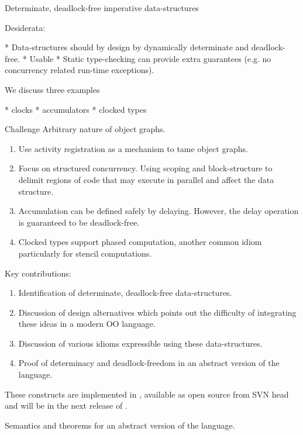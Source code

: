 Determinate, deadlock-free imperative data-structures

Desiderata:

 * Data-structures should by design by dynamically determinate and
   deadlock-free.
 * Usable
 * Static type-checking can provide extra guarantees (e.g. no
   concurrency related run-time exceptions).

We discuss three examples

  * clocks
  * accumulators
  * clocked types

Challenge
  Arbitrary nature of object graphs.


{\em 
\begin{enumerate}
\item Use activity registration as a mechanism to tame object graphs.
\item Focus on structured concurrency. Using scoping and block-structure
    to delimit regions of code that may execute in parallel and affect
    the data structure.

\item Accumulation can be defined safely by delaying. However, the delay
    operation is guaranteed to be deadlock-free.

\item Clocked types support phased computation, another common idiom
    particularly for stencil computations.
\end{enumerate}
}

Key contributions:
{\em 
\begin{enumerate}
\item Identification of determinate, deadlock-free data-structures. 
\item Discussion of design alternatives which points out the
  difficulty of integrating these ideas in a modern OO language.
\item Discussion of various idioms expressible using these data-structures.
\item Proof of determinacy and deadlock-freedom in an abstract version
  of the language.
\end{enumerate}
These constructs are implemented in \Xten, available as open source from
SVN head and will be in the next release of \Xten.
}


Semantics and theorems for an abstract version of the language.

